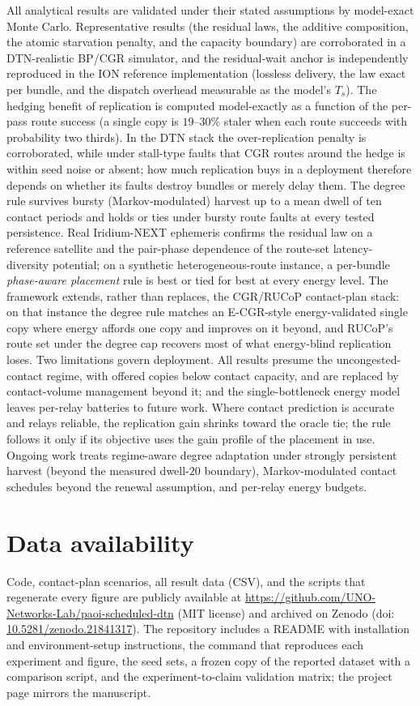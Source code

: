 \documentclass[twocolumn,3p,times,procedia]{elsarticle}
\theoremstyle{plain}
\theoremstyle{remark}
\begin{document}
All analytical results are validated under their stated assumptions by
model-exact Monte Carlo. Representative results (the residual laws,
the additive composition, the atomic starvation penalty, and the
capacity boundary) are corroborated in a DTN-realistic BP/CGR
simulator, and the residual-wait anchor is independently
reproduced in the ION reference implementation (lossless delivery, the
law exact per bundle, and the dispatch overhead measurable as the
model's $T_s$). The hedging benefit of replication is computed
model-exactly as a function of the per-pass route success (a single
copy is $19$--$30\%$ staler when each route succeeds with probability
two thirds). In the DTN stack the over-replication penalty is
corroborated, while under stall-type faults that CGR routes around the
hedge is within seed noise or absent; how much replication buys in a
deployment therefore depends on whether its faults destroy bundles or
merely delay them. The degree rule survives bursty
(Markov-modulated) harvest up to a mean dwell of ten contact periods and
holds or ties under bursty route faults at every tested persistence.
Real Iridium-NEXT ephemeris confirms the residual law on a reference
satellite and the pair-phase dependence of the route-set
latency-diversity potential; on a synthetic heterogeneous-route
instance, a per-bundle \emph{phase-aware placement} rule is best or
tied for best at every energy level. The framework extends, rather than
replaces, the CGR/RUCoP contact-plan stack: on that instance the degree
rule matches an E-CGR-style energy-validated single copy where energy
affords one copy and improves on it beyond, and RUCoP's route set under
the degree cap recovers most of what energy-blind replication loses.
Two limitations govern deployment. All results presume the
uncongested-contact regime, with offered copies below contact
capacity, and are replaced by contact-volume management beyond it;
and the single-bottleneck energy model leaves per-relay batteries to
future work. Where contact prediction is accurate and relays reliable,
the replication gain shrinks toward the oracle tie; the rule follows it
only if its objective uses the gain profile of the placement in use.
Ongoing work treats regime-aware degree adaptation under strongly
persistent harvest (beyond the measured dwell-$20$ boundary),
Markov-modulated contact schedules beyond the renewal assumption, and
per-relay energy budgets.

\section*{Data availability}
Code, contact-plan scenarios, all result data (CSV), and the scripts
that regenerate every figure are publicly available at
\url{https://github.com/UNO-Networks-Lab/paoi-scheduled-dtn} (MIT license) and
archived on Zenodo (doi:\allowbreak
\url{10.5281/zenodo.21841317}). The repository includes a README with
installation and environment-setup instructions, the command that
reproduces each experiment and figure, the seed sets, a frozen copy of
the reported dataset with a comparison script, and the experiment-to-claim
validation matrix; the project page mirrors the manuscript.
\end{document}
